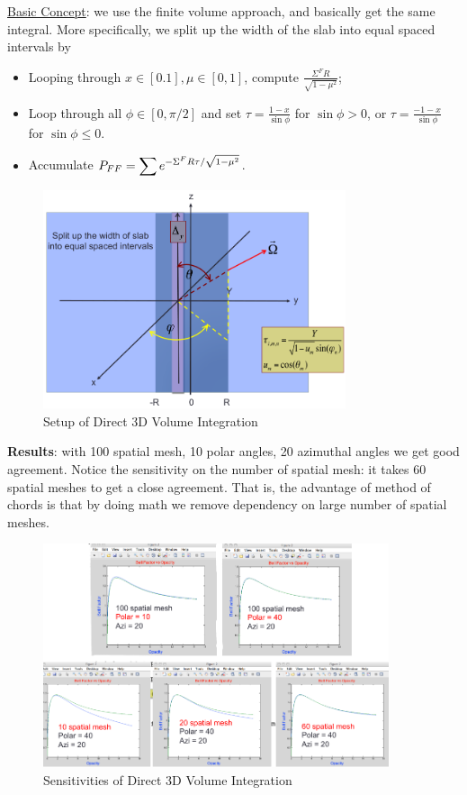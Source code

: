 \documentclass{school-22.211-notes}
\begin{document}
\clearpage
{}
\uline{Basic Concept}: we use the finite volume approach, and basically get the same integral. More specifically, we split up the width of the slab into equal spaced intervals by 
\begin{itemize}
\item Looping through $x \in [0.1], \mu \in [0,1]$, compute $\frac{\Sigma^F R}{\sqrt{1-\mu^2}}$;
\item Loop through all $\phi \in[0,\pi/2]$ and set $\tau = \frac{1-x}{\sin \phi}$ for $\sin \phi > 0$, or $\tau = \frac{-1-x}{\sin \phi}$ for $\sin \phi \le 0$. \item Accumulate $P_{FF} = \displaystyle\sum e^{-\Sigma^F R \tau / \sqrt{1-\mu^2}}$. 
\end{itemize}
\begin{figure}[h]
  \centering
  \includegraphics[width=3.5in]{images/pin/numerical-integral-1.png}
  \caption{Setup of Direct 3D Volume Integration} 
\end{figure}
\textbf{Results}: with 100 spatial mesh, 10 polar angles, 20 azimuthal angles we get good agreement. Notice the sensitivity on the number of spatial mesh: it takes 60 spatial meshes to get a close agreement. That is, the advantage of method of chords is that by doing math we remove dependency on large number of spatial meshes. 
\begin{figure}[h]
  \centering
  \includegraphics[width=4in]{images/pin/numerical-integral-2.png}
  \caption{Sensitivities of Direct 3D Volume Integration} 
\end{figure}
\end{document}
